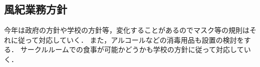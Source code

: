 \subsection*{風紀業務方針}


今年は政府の方針や学校の方針等，変化することがあるのでマスク等の規則はそれに従って対応していく．
また，アルコールなどの消毒用品も設置の検討をする．
サークルルームでの食事が可能かどうかも学校の方針に従って対応していく．
